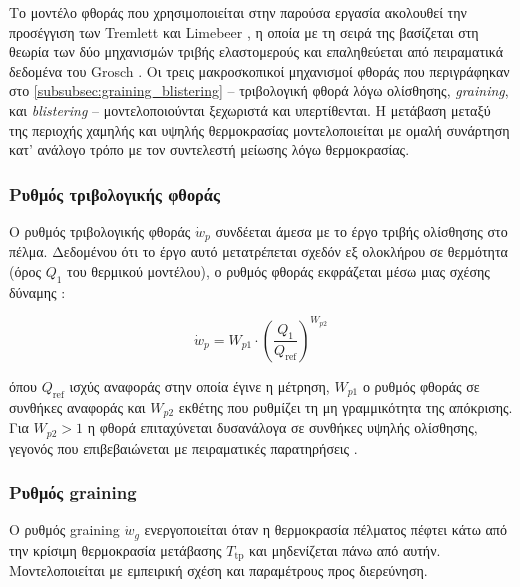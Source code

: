 
\label{subsec:wear_model}

Το μοντέλο φθοράς που χρησιμοποιείται στην παρούσα εργασία ακολουθεί την προσέγγιση των
Tremlett και Limebeer \cite{Tremlett2016}, η οποία με τη σειρά της βασίζεται στη θεωρία των δύο
μηχανισμών τριβής ελαστομερούς και επαληθεύεται από πειραματικά δεδομένα του Grosch \cite{Grosch2004}. Οι τρεις μακροσκοπικοί μηχανισμοί
φθοράς που περιγράφηκαν στο \cref{subsubsec:graining_blistering} -- τριβολογική
φθορά λόγω ολίσθησης, \textit{graining}, και \textit{blistering} -- μοντελοποιούνται ξεχωριστά και υπερτίθενται.
Η μετάβαση μεταξύ της περιοχής χαμηλής και υψηλής θερμοκρασίας μοντελοποιείται με ομαλή συνάρτηση κατ' ανάλογο τρόπο με
τον συντελεστή μείωσης λόγω θερμοκρασίας. 

\subsubsection{Ρυθμός τριβολογικής φθοράς}

Ο ρυθμός τριβολογικής φθοράς $\dot{w}_p$ συνδέεται άμεσα με το έργο τριβής ολίσθησης στο
πέλμα. Δεδομένου ότι το έργο αυτό μετατρέπεται σχεδόν εξ ολοκλήρου σε θερμότητα (όρος
$Q_1$ του θερμικού μοντέλου), ο ρυθμός φθοράς εκφράζεται μέσω μιας
σχέσης δύναμης \cite{Grosch2004}:

\begin{equation}
    \dot{w}_p = W_{p1} \cdot \left(\frac{Q_1}{Q_{\mathrm{ref}}}\right)^{W_{p2}}
    \label{eq:w_p}
\end{equation}

όπου $Q_{\mathrm{ref}}$ ισχύς αναφοράς στην οποία έγινε η μέτρηση, $W_{p1}$ ο ρυθμός φθοράς σε συνθήκες αναφοράς
και $W_{p2}$ εκθέτης που ρυθμίζει τη μη γραμμικότητα της απόκρισης. Για $W_{p2} > 1$ η
φθορά επιταχύνεται δυσανάλογα σε συνθήκες υψηλής ολίσθησης, γεγονός που επιβεβαιώνεται με
πειραματικές παρατηρήσεις \cite{Grosch2004,Tremlett2016}.

\subsubsection{Ρυθμός graining}

Ο ρυθμός graining $\dot{w}_g$ ενεργοποιείται όταν η θερμοκρασία πέλματος πέφτει κάτω από την
κρίσιμη θερμοκρασία μετάβασης $T_{\mathrm{tp}}$ και μηδενίζεται πάνω από αυτήν.
Μοντελοποιείται με εμπειρική σχέση και παραμέτρους προς διερεύνηση.

